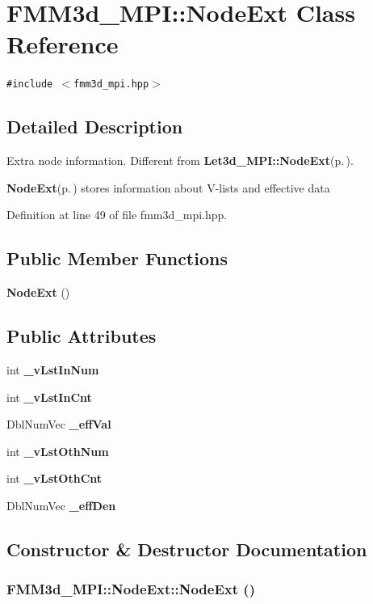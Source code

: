 \section{FMM3d\_\-MPI::Node\-Ext Class Reference}
\label{classFMM3d__MPI_1_1NodeExt}
{\tt \#include $<$fmm3d\_\-mpi.hpp$>$}



\subsection{Detailed Description}
Extra node information. Different from {\bf Let3d\_\-MPI::Node\-Ext}{\rm (p.\,\pageref{classLet3d__MPI_1_1NodeExt})}. 

{\bf Node\-Ext}{\rm (p.\,\pageref{classFMM3d__MPI_1_1NodeExt})} stores information about V-lists and effective data 



Definition at line 49 of file fmm3d\_\-mpi.hpp.\subsection*{Public Member Functions}
\begin{CompactItemize}
\item 
{\bf Node\-Ext} ()
\end{CompactItemize}
\subsection*{Public Attributes}
\begin{CompactItemize}
\item 
int {\bf \_\-v\-Lst\-In\-Num}
\item 
int {\bf \_\-v\-Lst\-In\-Cnt}
\item 
Dbl\-Num\-Vec {\bf \_\-eff\-Val}
\item 
int {\bf \_\-v\-Lst\-Oth\-Num}
\item 
int {\bf \_\-v\-Lst\-Oth\-Cnt}
\item 
Dbl\-Num\-Vec {\bf \_\-eff\-Den}
\end{CompactItemize}


\subsection{Constructor \& Destructor Documentation}
\subsubsection{\setlength{\rightskip}{0pt plus 5cm}FMM3d\_\-MPI::Node\-Ext::Node\-Ext ()\hspace{0.3cm}{\tt  [inline]}}\label{classFMM3d__MPI_1_1NodeExt_c0f80386fdfa6d2ef85f373b6c73c145_c0f80386fdfa6d2ef85f373b6c73c145}



